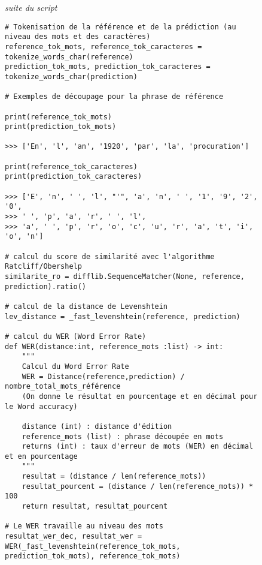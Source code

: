 \begin{figure}[h]
\small{\textit{suite du script}}
\lstset{language=Python}
\begin{lstlisting}
# Tokenisation de la référence et de la prédiction (au niveau des mots et des caractères)
reference_tok_mots, reference_tok_caracteres = tokenize_words_char(reference)
prediction_tok_mots, prediction_tok_caracteres = tokenize_words_char(prediction)

# Exemples de découpage pour la phrase de référence

print(reference_tok_mots)
print(prediction_tok_mots)

>>> ['En', 'l', 'an', '1920', 'par', 'la', 'procuration']

print(reference_tok_caracteres)
print(prediction_tok_caracteres)

>>> ['E', 'n', ' ', 'l', "'", 'a', 'n', ' ', '1', '9', '2', '0', 
>>> ' ', 'p', 'a', 'r', ' ', 'l', 
>>> 'a', ' ', 'p', 'r', 'o', 'c', 'u', 'r', 'a', 't', 'i', 'o', 'n']

# calcul du score de similarité avec l'algorithme Ratcliff/Obershelp
similarite_ro = difflib.SequenceMatcher(None, reference, prediction).ratio()

# calcul de la distance de Levenshtein
lev_distance = _fast_levenshtein(reference, prediction)

# calcul du WER (Word Error Rate)
def WER(distance:int, reference_mots :list) -> int:
	"""
	Calcul du Word Error Rate
	WER = Distance(reference,prediction) / nombre_total_mots_référence
	(On donne le résultat en pourcentage et en décimal pour le Word accuracy)
	
	distance (int) : distance d'édition
	reference_mots (list) : phrase découpée en mots
	returns (int) : taux d'erreur de mots (WER) en décimal et en pourcentage
	"""
	resultat = (distance / len(reference_mots))
	resultat_pourcent = (distance / len(reference_mots)) * 100
	return resultat, resultat_pourcent

# Le WER travaille au niveau des mots
resultat_wer_dec, resultat_wer = WER(_fast_levenshtein(reference_tok_mots, prediction_tok_mots), reference_tok_mots)

\end{lstlisting}
\end{figure}
